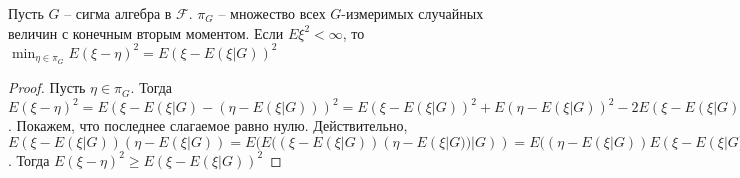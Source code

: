 \documentclass[document.tex]{subfiles}
\begin{document}
\begin{theorem}
    Пусть $G$ -- сигма алгебра в $\mathcal{F}$. $\pi_G$ -- множество всех $G$-измеримых случайных величин с конечным
    вторым моментом. Если $E\xi^2 < \infty$, то $\min_{\eta \in \pi_G} E(\xi - \eta)^2 = E(\xi - E(\xi|G))^2$
\end{theorem}

\begin{proof}
    Пусть $\eta \in \pi_G$. Тогда $E(\xi - \eta)^2 = E(\xi - E(\xi|G) - (\eta - E(\xi|G)))^2 = E(\xi - E(\xi|G))^2 +
    E(\eta - E(\xi|G))^2 - 2E(\xi - E(\xi|G))(\eta - E(\xi|G))$. Покажем, что последнее слагаемое равно нулю.
    Действительно, $E(\xi - E(\xi|G))(\eta - E(\xi|G)) = E(E( (\xi - E(\xi|G))(\eta - E(\xi|G)) |G)) = E( (\eta -
    E(\xi|G)) E(\xi - E(\xi|G)|G)) = E( (\eta - E(\xi|G)) (E(\xi|G) - E(\xi|G))) = E0 = 0$.
    Тогда $E(\xi - \eta)^2 \geq E(\xi - E(\xi|G))^2$
\end{proof}
\end{document}

